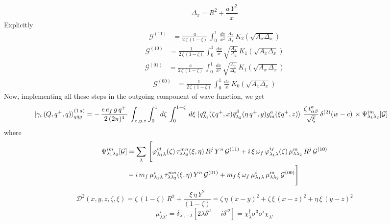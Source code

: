 \documentclass[9pt]{article}
\numberwithin{equation}{section}
\begin{document}
\begin{enumerate}
$$\Delta_{x} = R^{2} + \frac{a\,Y^{2}}{x}$$
Explicitly
\begin{align}
    \mathcal{G}^{(11)} & = \frac{a}{2\,\zeta\, (1-\zeta)}\, \int_{0}^{1}\, \frac{dx}{x^{2}}\, \frac{A_{x}}{\Delta_{x}}\,K_{2}\left(\sqrt{A_{x}\Delta_{x}}\right)
\end{align}
\begin{align}
    \mathcal{G}^{(10)} & = \frac{1}{2\, \zeta\, (1-\zeta)}\, \int_{0}^{1}\, \frac{dx}{x}\, \sqrt{\frac{A_{x}}{\Delta_{x}}}\, K_{1}\left(\sqrt{A_{x}\Delta_{x}}\right)
\end{align}
\begin{align}
     \mathcal{G}^{(01)} & = \frac{a}{2\, \zeta\, (1-\zeta)}\, \int_{0}^{1}\, \frac{dx}{x^{2}}\, \sqrt{\frac{A_{x}}{\Delta_{x}}}\, K_{1}\left(\sqrt{A_{x}\,\Delta_{x}}\right)
\end{align}
\begin{align}
     \mathcal{G}^{(00)} & = \frac{1}{2\, \zeta\, (1-\zeta)}\, \int_{0}^{1}\, \frac{dx}{x}\,K_{0}\left(\sqrt{A_{x}\Delta_{x}}\right)
\end{align}
Now, implementing all these steps in the outgoing component of wave function, we get
\begin{align}
    \ket{\gamma_{i}\,(Q,q^{+},q)}^{(1\,a)}_{q\Bar{q}g} &  = -\,\frac{e\,e_{f}\,g\,q^{+}\,}{2\,(2\pi)^{4}}\, \int_{x,y,z} \int_{0}^{1}\, d\zeta\, \int_{0}^{1-\zeta}\, d\xi\,\ket{q^{\alpha}_{\lambda_{1}}(\zeta q^{+},x)\Bar{q}^{\beta}_{\lambda_{2}}(\eta\,q^{+},y)g^{a}_{m}(\xi q^{+},z)}\, \frac{\zeta\, t^{a}_{\alpha\beta}}{\sqrt{\xi}}\, \delta^{(2)}(w-c)\,\times \Psi^{im}_{\lambda_{1}\lambda_{2}}[\mathcal{G}]
\end{align}
where 
\begin{align}
  \Psi^{im}_{\lambda_{1}\lambda_{2}}[\mathcal{G}] & = \sum_{\lambda}\, \Bigg[\varphi^{ij}_{\lambda_{1}\lambda}(\zeta)\,\tau^{mn}_{\lambda\lambda_{2}}(\xi,\eta)\,R^{j}\,Y^{n}\,\mathcal{G}^{(11)}+i\,\xi\,\omega_{f}\,\varphi^{ij}_{\lambda_{1}\lambda}(\zeta)\,\mu^{m}_{\lambda\lambda_{2}}\,R^{j}\,\mathcal{G}^{(10)}\notag \\ & -i\,m_{f}\,\mu^{i}_{\lambda_{1}\lambda}\,\tau^{mn}_{\lambda\lambda_{2}}(\xi,\eta)\,Y^{n}\,\mathcal{G}^{(01)} + m_{f}\,\xi\,\omega_{f}\,\mu^{i}_{\lambda_{1}\lambda}\,\mu^{m}_{\lambda\lambda_{2}}\,\mathcal{G}^{(00)}\Bigg]  
\end{align}
$$\mathcal{D}^{2}(x,y,z,\zeta,\xi) = \zeta\,(1-\zeta)\,R^{2} + \frac{\xi\,\eta\,Y^{2}}{(1-\zeta)} = \zeta\,\eta\,(x-y)^{2} + \zeta\,\xi\,(x-z)^{2} + \eta\,\xi\,(y-z)^{2}$$
$$\mu^{i}_{\lambda\lambda'} = \delta_{\lambda',-\lambda}\left[2\lambda\delta^{i1} - i\delta^{i2}\right] = \chi^{\dagger}_{\lambda}\sigma^{3}\sigma^{i}\chi_{\lambda'}$$

\end{enumerate}
\end{document}
